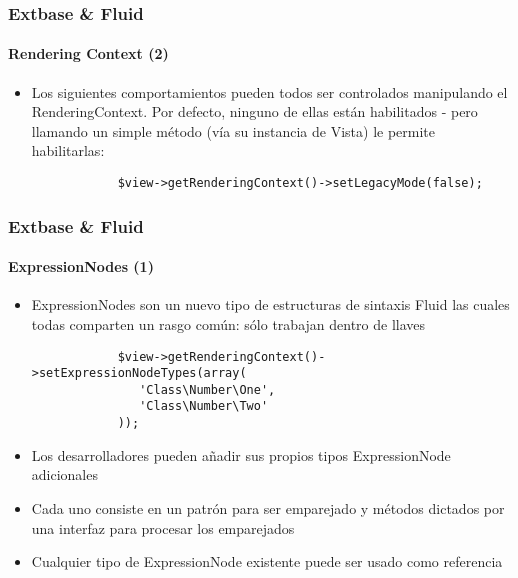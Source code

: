\begin{frame}[fragile]
	\frametitle{Extbase \& Fluid}
	\framesubtitle{Rendering Context (2)}

	\lstset{basicstyle=\smaller\ttfamily}

	\begin{itemize}

		\item Los siguientes comportamientos pueden todos ser controlados manipulando
			el RenderingContext. Por defecto, ninguno de ellas están habilitados - pero llamando
			un simple método (vía su instancia de Vista) le permite habilitarlas:

		\begin{lstlisting}
			$view->getRenderingContext()->setLegacyMode(false);
		\end{lstlisting}

	\end{itemize}

\end{frame}


\begin{frame}[fragile]
	\frametitle{Extbase \& Fluid}
	\framesubtitle{ExpressionNodes (1)}

	\lstset{basicstyle=\smaller\ttfamily}

	\begin{itemize}

		\item ExpressionNodes son un nuevo tipo de estructuras de sintaxis Fluid las cuales todas
			comparten un rasgo común: sólo trabajan dentro de llaves

		\begin{lstlisting}
			$view->getRenderingContext()->setExpressionNodeTypes(array(
			   'Class\Number\One',
			   'Class\Number\Two'
			));
		\end{lstlisting}

		\item Los desarrolladores pueden añadir sus propios tipos ExpressionNode adicionales

		\item Cada uno consiste en un patrón para ser emparejado y métodos dictados
			por una interfaz para procesar los emparejados

		\item Cualquier tipo de ExpressionNode existente puede ser usado como referencia

	\end{itemize}

\end{frame}

